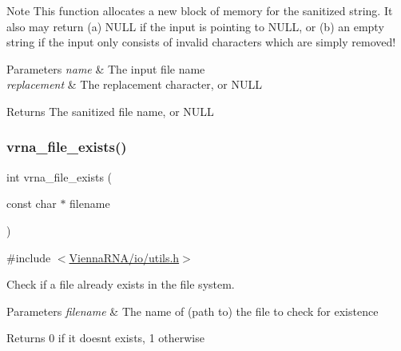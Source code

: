 \begin{DoxyNote}{Note}
This function allocates a new block of memory for the sanitized string. It also may return (a) N\+U\+LL if the input is pointing to N\+U\+LL, or (b) an empty string if the input only consists of invalid characters which are simply removed!
\end{DoxyNote}

\begin{DoxyParams}{Parameters}
{\em name} & The input file name \\
\hline
{\em replacement} & The replacement character, or N\+U\+LL \\
\hline
\end{DoxyParams}
\begin{DoxyReturn}{Returns}
The sanitized file name, or N\+U\+LL 
\end{DoxyReturn}
\mbox{\label{group__file__utils_ga80cf1f4bb5704622f72f2911f48aee55}} 
\subsubsection{\texorpdfstring{vrna\_file\_exists()}{vrna\_file\_exists()}}
{\footnotesize\ttfamily int vrna\+\_\+file\+\_\+exists (\begin{DoxyParamCaption}\item[{const char $\ast$}]{filename }\end{DoxyParamCaption})}



{\ttfamily \#include $<$\mbox{\hyperlink{io_2utils_8h}{Vienna\+R\+N\+A/io/utils.\+h}}$>$}



Check if a file already exists in the file system. 


\begin{DoxyParams}{Parameters}
{\em filename} & The name of (path to) the file to check for existence \\
\hline
\end{DoxyParams}
\begin{DoxyReturn}{Returns}
0 if it doesn\textquotesingle{}t exists, 1 otherwise 
\end{DoxyReturn}
